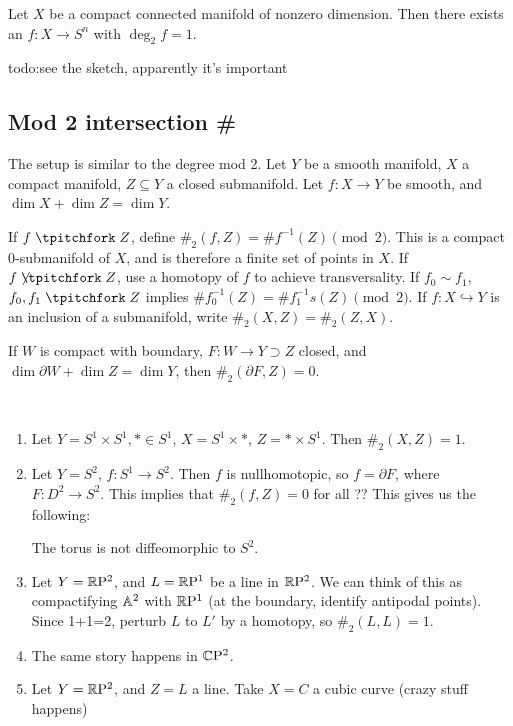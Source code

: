 \begin{prop}
    Let $X$ be a compact connected manifold of nonzero dimension. Then there exists an $f \colon X \to S^n $ with $\operatorname{deg}_2f=1$.
\end{prop}
{\color{red}todo:see the sketch, apparently it's important} 

\subsection{Mod 2 intersection \#}
The setup is similar to the degree mod 2. Let $Y$ be a smooth manifold, $X$ a compact manifold, $Z\subseteq Y$ a closed submanifold. Let $f \colon X \to Y$ be smooth, and $\dim X+\dim Z=\dim Y$.

\begin{definition}[]
    If $f \transv Z$, define $\#_2(f,Z)=\# f^{-1}(Z)\pmod 2$. This is a compact $0$-submanifold of $X$, and is therefore a finite set of points in $X$. If $f \not\transv Z$, use a homotopy of $f$ to achieve transversality. If $f_0\sim f_1$, $f_0,f_1\transv Z $ implies $\# f_0^{-1}(Z)=\# f_1^{-1}s(Z)\pmod 2$. If $f \colon X \hookrightarrow Y$ is an inclusion of a submanifold, write $\#_2(X,Z)=\#_2(Z,X)$.
\end{definition}
If $W$ is compact with boundary, $F \colon W \to Y\supset Z$  closed, and $\dim \partial W+\dim Z=\dim Y$, then $\#_2(\partial F,Z)=0$.

\begin{example}
    \,
    \begin{enumerate}[label=(\arabic*)]
        \item Let $Y=S^1 \times S^1 , * \in S^1 $, $X=S^1 \times *$, $Z=*\times S^1 $. Then $\#_2(X,Z)=1$.
        \item Let $Y=S^2$, $f \colon S^1  \to S^2$.  Then $f$ is nullhomotopic, so $f =\partial F$, where $F \colon D^2 \to S^2$. This implies that $\#_2(f,Z)=0$ for all ?? This gives us the following:
\begin{theorem}
    The torus is not diffeomorphic to $S^2$.
\end{theorem}
\item Let $Y=\mathbb{R} \mathrm P^2$, and $L =\mathbb{R} \mathrm P^1$ be a line in $\mathbb{R} \mathrm P^2$. We can think of this as compactifying $\mathbb{A}^2$ with $\mathbb{R} \mathrm P^1$ (at the boundary, identify antipodal points). Since 1+1=2, perturb $L$ to $L'$ by a homotopy, so $\#_2(L,L)=1$.
\item The same story happens in $\mathbb{C}\mathrm P^2$.
\item Let $Y=\mathbb{R} \mathrm P^2$, and $Z=L$ a line. Take $X=C$ a cubic curve (crazy stuff happens)
    \end{enumerate}
\end{example}
